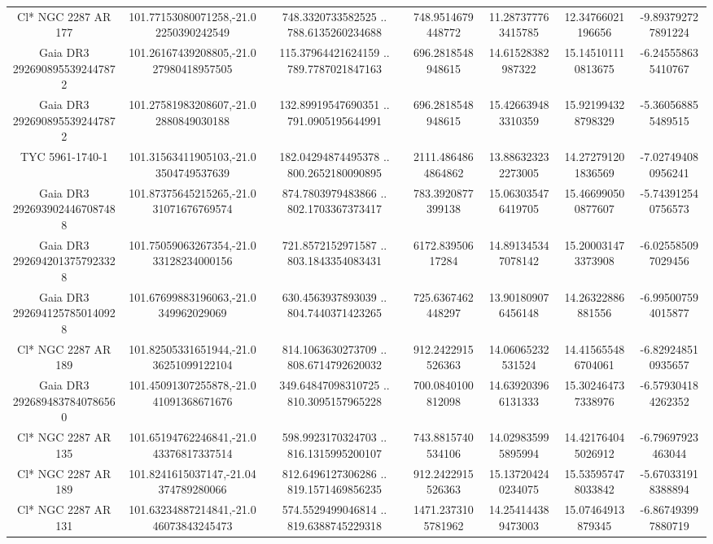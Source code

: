 \begin{table}
\begin{tabular}{ccccccc}
Cl* NGC 2287     AR     177 & 101.77153080071258,-21.02250390242549 & 748.3320733582525 .. 788.6135260234688 & 748.9514679448772 & 11.287377763415785 & 12.34766021196656 & -9.893792727891224 \\
Gaia DR3 2926908955392447872 & 101.26167439208805,-21.027980418957505 & 115.37964421624159 .. 789.7787021847163 & 696.2818548948615 & 14.61528382987322 & 15.145101110813675 & -6.245558635410767 \\
Gaia DR3 2926908955392447872 & 101.27581983208607,-21.02880849030188 & 132.89919547690351 .. 791.0905195644991 & 696.2818548948615 & 15.426639483310359 & 15.921994328798329 & -5.360568855489515 \\
TYC 5961-1740-1 & 101.31563411905103,-21.03504749537639 & 182.04294874495378 .. 800.2652180090895 & 2111.4864864864862 & 13.886323232273005 & 14.272791201836569 & -7.027494080956241 \\
Gaia DR3 2926939024467087488 & 101.87375645215265,-21.031071676769574 & 874.7803979483866 .. 802.1703367373417 & 783.3920877399138 & 15.063035476419705 & 15.466990500877607 & -5.743912540756573 \\
Gaia DR3 2926942013757923328 & 101.75059063267354,-21.033128234000156 & 721.8572152971587 .. 803.1843354083431 & 6172.83950617284 & 14.891345347078142 & 15.200031473373908 & -6.025585097029456 \\
Gaia DR3 2926941257850140928 & 101.67699883196063,-21.0349962029069 & 630.4563937893039 .. 804.7440371423265 & 725.6367462448297 & 13.901809076456148 & 14.26322886881556 & -6.995007594015877 \\
Cl* NGC 2287     AR     189 & 101.82505331651944,-21.036251099122104 & 814.1063630273709 .. 808.6714792620032 & 912.2422915526363 & 14.06065232531524 & 14.415655486704061 & -6.829248510935657 \\
Gaia DR3 2926894837840786560 & 101.45091307255878,-21.041091368671676 & 349.64847098310725 .. 810.3095157965228 & 700.0840100812098 & 14.639203966131333 & 15.302464737338976 & -6.579304184262352 \\
Cl* NGC 2287     AR     135 & 101.65194762246841,-21.043376817337514 & 598.9923170324703 .. 816.1315995200107 & 743.8815740534106 & 14.029835995895994 & 14.421764045026912 & -6.79697923463044 \\
Cl* NGC 2287     AR     189 & 101.8241615037147,-21.04374789280066 & 812.6496127306286 .. 819.1571469856235 & 912.2422915526363 & 15.137204240234075 & 15.535957478033842 & -5.670331918388894 \\
Cl* NGC 2287     AR     131 & 101.63234887214841,-21.046073843245473 & 574.5529499046814 .. 819.6388745229318 & 1471.2373105781962 & 14.254144389473003 & 15.07464913879345 & -6.867493997880719 \\

\end{tabular}
\end{table}
